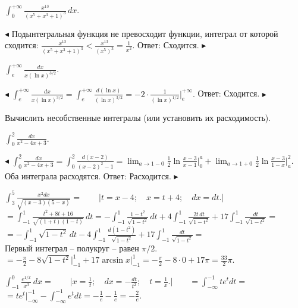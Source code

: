 \documentclass[a5paper,10pt]{article}
\begin{document}
\bigskip{} $\displaystyle \int_0^{+\infty}\frac{x^{13}}{(x^5+x^3+1)^3}\,dx$.

\smallskip
\noindent $\blacktriangleleft$ Подынтегральная функция не превосходит функции,
интеграл от которой сходится:
$\displaystyle\frac{x^{13}}{(x^5+x^3+1)^3}<\frac{x^{13}}{(x^5)^3}=\frac{1}{x^2}$.
Ответ: Сходится. $\blacktriangleright$

\medskip
{} $\displaystyle \int_e^{+\infty}\frac{dx}{x(\ln x)^{3/2}}$.

\smallskip
\noindent $\blacktriangleleft$ $\displaystyle \int_e^{+\infty}\frac{dx}{x(\ln x)^{3/2}}=
\int_e^{+\infty}\frac{d(\ln x)}{(\ln x)^{3/2}}=-2\cdot\frac{1}{(\ln x)^{1/2}}\Big|_e^{+\infty}.$
Ответ: Сходится. $\blacktriangleright$

\bigskip\noindent Вычислить несобственные интегралы (или установить их расходимость).

\bigskip
{} $\displaystyle \int_0^2\frac{dx}{ x^2-4x+3}$.

\smallskip
\noindent $\blacktriangleleft$ $\displaystyle \int_0^2\frac{dx}{ x^2-4x+3}=
\int_0^2\frac{d(x-2)}{ (x-2)^2-1}=
\lim_{a\to1-0}\frac12\ln\frac{x-3}{x-1}\Big|_0^a+\lim_{a\to1+0}\frac12\ln\frac{x-3}{1-x}\Big|_a^2$.
Оба интеграла расходятся. Ответ: Расходится. $\blacktriangleright$

\medskip
{} $\displaystyle \int_3^5\frac{x^2dx}{\sqrt{(x-3)(5-x)}}=
\qquad\Big|t=x-4;\quad x=t+4;\quad dx=dt.\Big|$\\
$\displaystyle =\int_{-1}^1\frac{t^2+8t+16}{\sqrt{(1+t)(1-t)}}\,dt=
-\int_{-1}^1\frac{1-t^2}{\sqrt{1-t^2}}\,dt
+4\int_{-1}^1\frac{2t\,dt}{\sqrt{1-t^2}}+17\int_{-1}^1\frac{dt}{\sqrt{1-t^2}}=$\\
$\displaystyle =-\int_{-1}^1\sqrt{1-t^2}\,dt
-4\int_{-1}^1\frac{d(1-t^2)}{\sqrt{1-t^2}}+17\int_{-1}^1\frac{dt}{\sqrt{1-t^2}}=$\\
Первый интеграл -- полукруг -- равен $\pi/2.$\\
$\displaystyle =-\frac{\pi}{2}-8\sqrt{1-t^2}\Big|_{-1}^1+17\arcsin x\Big|_{-1}^1=
-\frac{\pi}{2}-8\cdot0+17\pi=\frac{33}{2}\pi.$

\medskip
{} $\displaystyle \int_{-1}^0\frac{e^{1/x}}{x^3}\,dx=\qquad \Big| x=\frac 1t;\quad
dx=-\frac{dt}{t^2};\quad t=\frac 1x.\Big|\qquad=\int_{-\infty}^{-1}te^tdt=$\\
$\displaystyle =te^t\Big|_{-\infty}^{-1}-\int_{-\infty}^{-1}e^tdt=-\frac 1e-\frac 1e=-\frac 2e$.
\end{document}
